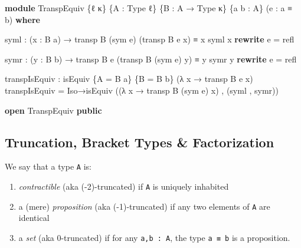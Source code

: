 \documentclass[
  11pt,
  oneside,
  article]{memoir}
\newenvironment{Shaded}{}{}
\newcommand{\KeywordTok}[1]{\textcolor[rgb]{0.00,0.44,0.13}{\textbf{#1}}}
\newcommand{\NormalTok}[1]{#1}
\newcommand{\OtherTok}[1]{\textcolor[rgb]{0.00,0.44,0.13}{#1}}
\providecommand{\tightlist}{%
  \setlength{\itemsep}{0pt}\setlength{\parskip}{0pt}}
\theoremstyle{definition}
\theoremstyle{plain}
\newcommand{\0}{\textsf{0}}
\newcommand{\1}{\tn{\textsf{1}}}
\begin{document}
\begin{Shaded}
\begin{Highlighting}[]
\KeywordTok{module}\NormalTok{ TranspEquiv }\OtherTok{\{}\NormalTok{ℓ κ}\OtherTok{\}} \OtherTok{\{}\NormalTok{A }\OtherTok{:}\NormalTok{ Type ℓ}\OtherTok{\}} \OtherTok{\{}\NormalTok{B }\OtherTok{:}\NormalTok{ A }\OtherTok{→}\NormalTok{ Type κ}\OtherTok{\}} \OtherTok{\{}\NormalTok{a b }\OtherTok{:}\NormalTok{ A}\OtherTok{\}} \OtherTok{(}\NormalTok{e }\OtherTok{:}\NormalTok{ a ≡ b}\OtherTok{)} \KeywordTok{where}

\NormalTok{    syml }\OtherTok{:} \OtherTok{(}\NormalTok{x }\OtherTok{:}\NormalTok{ B a}\OtherTok{)} \OtherTok{→}\NormalTok{ transp B }\OtherTok{(}\NormalTok{sym e}\OtherTok{)} \OtherTok{(}\NormalTok{transp B e x}\OtherTok{)}\NormalTok{ ≡ x}
\NormalTok{    syml x }\KeywordTok{rewrite}\NormalTok{ e }\OtherTok{=}\NormalTok{ refl}

\NormalTok{    symr }\OtherTok{:} \OtherTok{(}\NormalTok{y }\OtherTok{:}\NormalTok{ B b}\OtherTok{)} \OtherTok{→}\NormalTok{ transp B e }\OtherTok{(}\NormalTok{transp B }\OtherTok{(}\NormalTok{sym e}\OtherTok{)}\NormalTok{ y}\OtherTok{)}\NormalTok{ ≡ y}
\NormalTok{    symr y }\KeywordTok{rewrite}\NormalTok{ e }\OtherTok{=}\NormalTok{ refl}

\NormalTok{    transpIsEquiv }\OtherTok{:}\NormalTok{ isEquiv }\OtherTok{\{}\NormalTok{A }\OtherTok{=}\NormalTok{ B a}\OtherTok{\}} \OtherTok{\{}\NormalTok{B }\OtherTok{=}\NormalTok{ B b}\OtherTok{\}} \OtherTok{(λ}\NormalTok{ x }\OtherTok{→}\NormalTok{ transp B e x}\OtherTok{)}
\NormalTok{    transpIsEquiv }\OtherTok{=}\NormalTok{ Iso→isEquiv }\OtherTok{((λ}\NormalTok{ x }\OtherTok{→}\NormalTok{ transp B }\OtherTok{(}\NormalTok{sym e}\OtherTok{)}\NormalTok{ x}\OtherTok{)}\NormalTok{ , }\OtherTok{(}\NormalTok{syml , symr}\OtherTok{))}

\KeywordTok{open}\NormalTok{ TranspEquiv }\KeywordTok{public}
\end{Highlighting}
\end{Shaded}

\subsection{Truncation, Bracket Types \&
Factorization}\label{truncation-bracket-types-factorization}

We say that a type \texttt{A} is:

\begin{enumerate}
\def\labelenumi{\arabic{enumi}.}
\tightlist
\item
  \emph{contractible} (aka (-2)-truncated) if \texttt{A} is uniquely
  inhabited
\item
  a (mere) \emph{proposition} (aka (-1)-truncated) if any two elements
  of \texttt{A} are identical
\item
  a \emph{set} (aka 0-truncated) if for any \texttt{a,b\ :\ A}, the type
  \texttt{a\ ≡\ b} is a proposition.
\end{enumerate}
\end{document}
